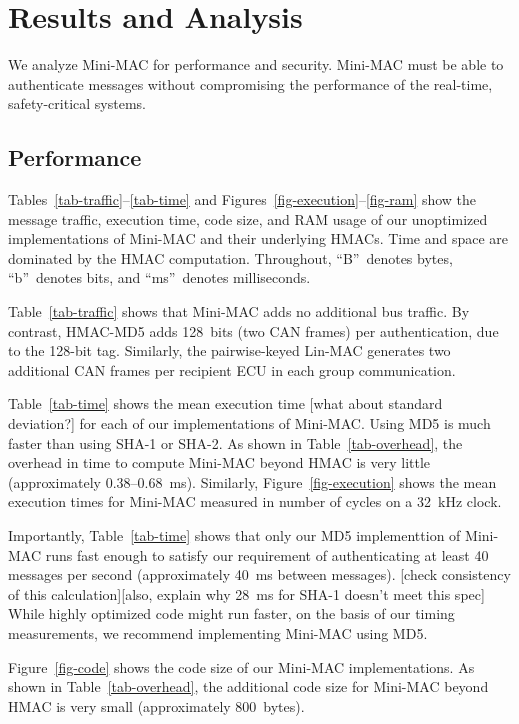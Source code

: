 \section{Results and Analysis}
\label{analysis}

We analyze Mini-MAC for performance and security. 
Mini-MAC must be able to authenticate messages 
without compromising the performance of the real-time, safety-critical systems.

\subsection{Performance}
\label{performance}

Tables~\ref{tab-traffic}--\ref{tab-time} and Figures~\ref{fig-execution}--\ref{fig-ram}
show the message traffic, execution time, code size, and RAM usage of our unoptimized implementations
of Mini-MAC and their underlying HMACs.  Time and space are dominated by the HMAC computation.
Throughout, ``B''~denotes bytes, ``b''~denotes bits, and ``ms''~denotes milliseconds.

Table~\ref{tab-traffic} shows that Mini-MAC adds no additional bus traffic.
By contrast, HMAC-MD5 adds 128~bits (two CAN frames) per authentication,
due to the 128-bit tag.  Similarly, the pairwise-keyed Lin-MAC generates
two additional CAN frames per recipient ECU in each group communication.

Table~\ref{tab-time} shows the mean execution time
[what about standard deviation?] for each of our implementations of Mini-MAC.
Using MD5 is much faster than using SHA-1 or SHA-2.  As shown in Table~\ref{tab-overhead},
the overhead in time to compute Mini-MAC beyond HMAC is very little (approximately 0.38--0.68~ms).
Similarly, Figure~\ref{fig-execution} shows the mean execution times for Mini-MAC measured
in number of cycles on a 32~kHz clock.

Importantly, Table~\ref{tab-time} shows that only our MD5 implementtion of Mini-MAC runs fast enough to satisfy our
requirement of authenticating at least 40 messages per second (approximately
40~ms between messages).   
[check consistency of this calculation][also, explain why 28~ms for SHA-1 doesn't meet
this spec]
While highly optimized code might run faster, on the
basis of our timing measurements, we recommend implementing Mini-MAC using MD5.

Figure~\ref{fig-code} shows the code size of our Mini-MAC implementations.
As shown in Table~\ref{tab-overhead}, the additional code size for Mini-MAC beyond
HMAC is very small (approximately 800~bytes).

